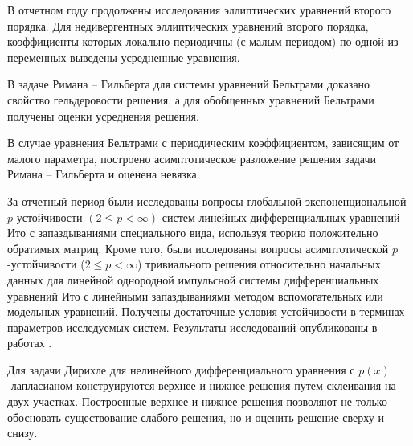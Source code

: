 \Conclusion

В отчетном году продолжены исследования эллиптических уравнений второго порядка. Для недивергентных эллиптических уравнений второго порядка, коэффициенты которых локально периодичны (с малым периодом) по одной из переменных выведены усредненные уравнения.

В задаче Римана -- Гильберта для системы уравнений Бельтрами доказано свойство гельдеровости решения, а для обобщенных уравнений Бельтрами получены оценки усреднения решения.

В случае уравнения Бельтрами с периодическим коэффициентом, зависящим от малого параметра, построено асимптотическое разложение решения задачи Римана – Гильберта и оценена невязка.


За отчетный период были исследованы вопросы глобальной экспоненциональной $p$-устой\-чи\-вос\-ти $(2 \le p < \infty)$ систем линейных дифференциальных уравнений Ито с запаздываниями
специального вида, используя теорию положительно обратимых матриц.
Кроме того, были исследованы вопросы асимптотической
$p$-устойчивости ($2 \le p < \infty $) тривиального решения
относительно начальных данных для линейной однородной импульсной
системы дифференциальных уравнений Ито с линейными запаздываниями
методом вспомогательных или модельных уравнений. Получены достаточные условия устойчивости в терминах параметров исследуемых систем. Результаты исследований опубликованы в работах \cite{kad11,kad12,kad13,kad14}.

Для задачи Дирихле для нелинейного дифференциального уравнения с $p(x)$-лапласиа\-ном конструируются верхнее и нижнее решения путем склеивания на двух участках.
Построенные верхнее и нижнее решения позволяют не только обосновать существование слабого решения, но и оценить решение сверху и  снизу.




